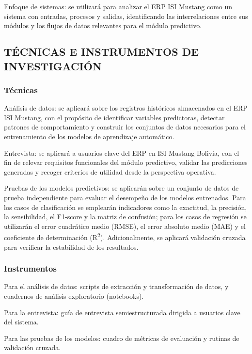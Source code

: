 \documentclass{univalle-perfil}
\begin{document}
Enfoque de sistemas: se utilizará para analizar el ERP ISI Mustang como un sistema con entradas, procesos y salidas, identificando las interrelaciones entre sus módulos y los flujos de datos relevantes para el módulo predictivo.

\subsection{TÉCNICAS E INSTRUMENTOS DE INVESTIGACIÓN}

\subsubsection{Técnicas}

Análisis de datos: se aplicará sobre los registros históricos almacenados en el ERP ISI Mustang, con el propósito de identificar variables predictoras, detectar patrones de comportamiento y construir los conjuntos de datos necesarios para el entrenamiento de los modelos de aprendizaje automático.

Entrevista: se aplicará a usuarios clave del ERP en ISI Mustang Bolivia, con el fin de relevar requisitos funcionales del módulo predictivo, validar las predicciones generadas y recoger criterios de utilidad desde la perspectiva operativa.

Pruebas de los modelos predictivos: se aplicarán sobre un conjunto de datos de prueba independiente para evaluar el desempeño de los modelos entrenados. Para los casos de clasificación se emplearán indicadores como la exactitud, la precisión, la sensibilidad, el F1-score y la matriz de confusión; para los casos de regresión se utilizarán el error cuadrático medio (RMSE), el error absoluto medio (MAE) y el coeficiente de determinación (R\textsuperscript{2}). Adicionalmente, se aplicará validación cruzada para verificar la estabilidad de los resultados.

\subsubsection{Instrumentos}

Para el análisis de datos: scripts de extracción y transformación de datos, y cuadernos de análisis exploratorio (notebooks).

Para la entrevista: guía de entrevista semiestructurada dirigida a usuarios clave del sistema.

Para las pruebas de los modelos: cuadro de métricas de evaluación y rutinas de validación cruzada.
\end{document}
